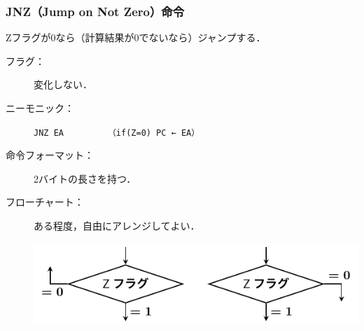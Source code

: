 \documentclass[handout]{beamer}        %
\begin{document}
\begin{frame}
  \frametitle{JNZ（Jump on Not Zero）命令}
  Zフラグが0なら（計算結果が0でないなら）ジャンプする．
  \vfill
  \begin{description}
  \item[フラグ：] 変化しない．
    \vfill

  \item[ニーモニック：]\texttt{JNZ EA}~~~~~~~~~\texttt{（if(Z=0) PC ← EA）}
    \vfill

  \item[命令フォーマット：] 2バイトの長さを持つ．\\
    \vfill

  \item[フローチャート：] ある程度，自由にアレンジしてよい．\\
    \centerline{\includegraphics[scale=0.7]{../Tikz/jnz.pdf}}
  \end{description}
  \vfill
\end{frame}
\end{document}
